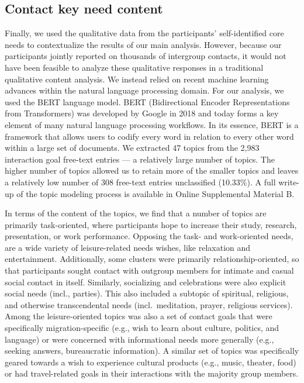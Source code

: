 \documentclass[man, 12pt, a4paper, mask]{apa7}
\theoremstyle{break}
\theoremstyle{plain}
\begin{document}
\subsection{Contact key need content}

Finally, we used the qualitative data from the participants'
self-identified core needs to contextualize the results of our main
analysis. However, because our participants jointly reported on
thousands of intergroup contacts, it would not have been feasible to
analyze these qualitative responses in a traditional qualitative content
analysis. We instead relied on recent machine learning advances within
the natural language processing domain. For our analysis, we used the
BERT language model. BERT (Bidirectional Encoder Representations from
Transformers) was developed by Google in 2018 and today forms a key
element of many natural language processing workflows. In its essence,
BERT is a framework that allows users to codify every word in relation
to every other word within a large set of documents. We extracted 47
topics from the 2,983 interaction goal free-text entries --- a
relatively large number of topics. The higher number of topics allowed
us to retain more of the smaller topics and leaves a relatively low
number of 308 free-text entries unclassified (10.33\%). A full write-up
of the topic modeling process is available in Online Supplemental
Material B.

In terms of the content of the topics, we find that a number of topics
are primarily task-oriented, where participants hope to increase their
study, research, presentation, or work performance. Opposing the task-
and work-oriented needs, are a wide variety of leisure-related needs
wishes, like relaxation and entertainment. Additionally, some clusters
were primarily relationship-oriented, so that participants sought
contact with outgroup members for intimate and casual social contact in
itself. Similarly, socializing and celebrations were also explicit
social needs (incl., parties). This also included a subtopic of
spiritual, religious, and otherwise transcendental needs
(incl.~meditation, prayer, religious services). Among the
leisure-oriented topics was also a set of contact goals that were
specifically migration-specific (e.g., wish to learn about culture,
politics, and language) or were concerned with informational needs more
generally (e.g., seeking answers, bureaucratic information). A similar
set of topics was specifically geared towards a wish to experience
cultural products (e.g., music, theater, food) or had travel-related
goals in their interactions with the majority group members.
\end{document}
